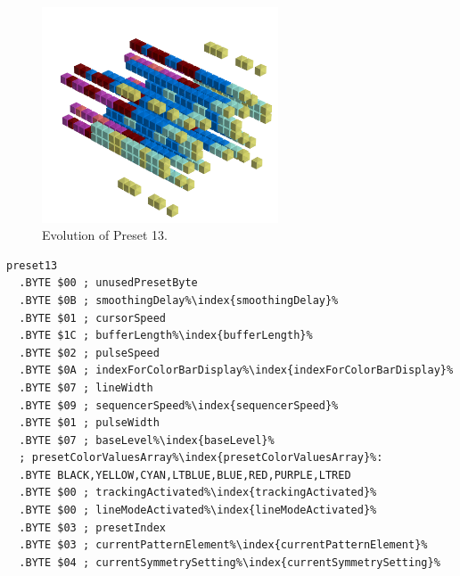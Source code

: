 \clearpage
\rhead[]{\leftmark}
\vspace*{-0.5cm}
\begin{minipage}[b]{0.48\linewidth}


                                                                 
\begin{figure}[H]                                                          
  \centering                                                             
  \begin{adjustbox}{width=7cm,center}                                   
  \includegraphics[width=7cm]{src/presets/pattern13-45.png}%
  \end{adjustbox}                                                        
\caption{Evolution of Preset 13.}                                           
\end{figure}                                                               
                                                                 
                                                                           
\end{minipage}
\hspace{0.1cm}
\begin{minipage}[b]{0.48\linewidth}                                       
\begin{lstlisting}[basicstyle=\ttfamily\scriptsize,caption=Data structure for Preset 13.,escapechar=\%]
preset13
  .BYTE $00 ; unusedPresetByte
  .BYTE $0B ; smoothingDelay%\index{smoothingDelay}%
  .BYTE $01 ; cursorSpeed
  .BYTE $1C ; bufferLength%\index{bufferLength}%
  .BYTE $02 ; pulseSpeed
  .BYTE $0A ; indexForColorBarDisplay%\index{indexForColorBarDisplay}%
  .BYTE $07 ; lineWidth
  .BYTE $09 ; sequencerSpeed%\index{sequencerSpeed}%
  .BYTE $01 ; pulseWidth
  .BYTE $07 ; baseLevel%\index{baseLevel}%
  ; presetColorValuesArray%\index{presetColorValuesArray}%: 
  .BYTE BLACK,YELLOW,CYAN,LTBLUE,BLUE,RED,PURPLE,LTRED
  .BYTE $00 ; trackingActivated%\index{trackingActivated}%
  .BYTE $00 ; lineModeActivated%\index{lineModeActivated}%
  .BYTE $03 ; presetIndex
  .BYTE $03 ; currentPatternElement%\index{currentPatternElement}%
  .BYTE $04 ; currentSymmetrySetting%\index{currentSymmetrySetting}%
\end{lstlisting}
\end{minipage}

